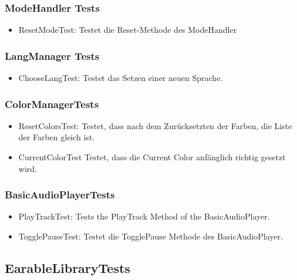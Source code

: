 \documentclass[../validierung.tex]{subfiles}
\begin{document}
			\subsubsection{ModeHandler Tests}
				\begin{itemize}
					\item ResetModeTest: Testet die Reset-Methode des ModeHandler
				\end{itemize}
			\subsubsection{LangManager Tests}
				\begin{itemize}
					\item ChooseLangTest: Testet das Setzen einer neuen Sprache.
				\end{itemize}
			\subsubsection{ColorManagerTests}
				\begin{itemize}
					\item ResetColorsTest: Testet, dass nach dem Zurücksetzten der Farben, die Liste der Farben gleich ist.
					\item CurrentColorTest Testet, dass die Current Color anfänglich richtig gesetzt wird.
				\end{itemize}
			\subsubsection{BasicAudioPlayerTests}
				\begin{itemize}
					\item PlayTrackTest: Tests the PlayTrack Method of the BasicAudioPlayer.
					\item TogglePauseTest: Testet die TogglePause Methode des BasicAudioPlayer.
				\end{itemize}
				
				
		\subsection{EarableLibraryTests}
\end{document}
